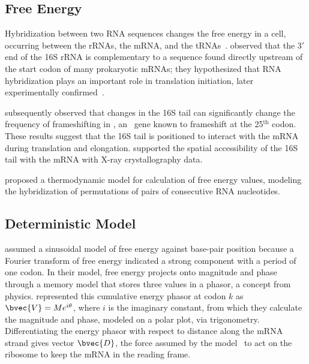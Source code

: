 \documentclass{article}
\begin{document}
\subsection{Free Energy}
\label{freeenergy}

Hybridization between two RNA sequences changes the free energy in a
cell, occurring between the rRNAs, the mRNA, and the tRNAs~\cite{starmer}.
\citet{sd} observed that the $3'$ end of the 16S rRNA is complementary to a sequence found 
directly upstream of the start codon of many prokaryotic mRNAs; they hypothesized that RNA hybridization 
plays an important role in translation initiation, later
experimentally confirmed~\cite{hui,jacob}.

\citet{weiss87} subsequently observed that changes in the 16S tail can 
significantly change the frequency of frameshifting in \prfB, an \ecoli\ gene 
known to frameshift at the 25$^\textrm{th}$ codon.  These results suggest that 
the 16S tail is positioned to interact with the mRNA during
translation and elongation. 
\citet{xray} supported the spatial accessibility of the 16S tail with the mRNA with 
X-ray crystallography data.

\citet{freier} proposed a thermodynamic model for calculation of free energy values,
modeling the hybridization of permutations of pairs of consecutive RNA nucleotides.

\subsection{Deterministic Model}
\citet{lalit:mechanics} assumed a sinusoidal model of free energy against base-pair position 
because a Fourier transform of free energy indicated a strong component with a period of one codon.  
In their model,
free energy projects onto magnitude and
phase through a memory model that stores three values
in a phasor, a concept from physics. 
\citeauthor{lalit:mechanics} represented this cumulative energy phasor
at codon $k$ as $\bvec{V} = Me^{i\theta}$, where $i$ is the imaginary
constant, from which they calculate the magnitude and phase, modeled
on a polar plot, via
trigonometry. Differentiating the energy phasor
with respect to distance along the mRNA strand gives 
vector $\bvec{D}$, the force assumed by the model~\cite{lalit:mechanics}
to act on the ribosome to keep the mRNA in the reading frame.
 
\end{document}
